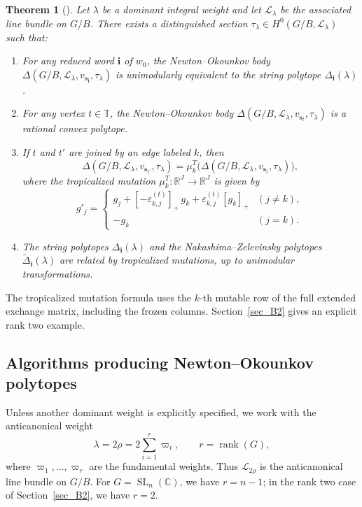 \documentclass[10pt]{amsart}
\numberwithin{equation}{section}
\DeclareMathOperator{\SL}{SL}
\newcommand{\C}{{\mathbb{C}}}
\newcommand{\R}{{\mathbb{R}}}
\theoremstyle{plain}
\newtheorem{theorem}{Theorem}[section]
\theoremstyle{definition}
\theoremstyle{remark}
\begin{document}
\begin{theorem}[{\cite[Corollaries~5.7(2), 6.6(1), 6.30 and Theorem~6.8(1)]{FujitaOya}}]\label{thm_Fujita_Oya}
	Let $\lambda$ be a dominant integral weight and let $\mathcal L_\lambda$ be the associated line bundle on $G/B$.
	There exists a distinguished section $\tau_\lambda\in H^0(G/B,\mathcal L_\lambda)$ such that:
	\begin{enumerate}
		\item For any reduced word ${\bm i}$ of $w_0$, the Newton--Okounkov body
		$\Delta(G/B,\mathcal L_\lambda,v_{{\bm s}_{\bm i}},\tau_\lambda)$ is unimodularly equivalent to the string polytope $\Delta_{\bm i}(\lambda)$.
		\item For any vertex $t\in\mathbb T$, the Newton--Okounkov body $\Delta(G/B,\mathcal L_\lambda,v_{{\bm s}_{t}},\tau_\lambda)$ is a rational convex polytope.
		\item If $t$ and $t'$ are joined by an edge labeled $k$, then
		\[
		\Delta(G/B,\mathcal L_\lambda,v_{{\bm s}_{t'}},\tau_\lambda)
		=\mu_k^{T}\bigl(\Delta(G/B,\mathcal L_\lambda,v_{{\bm s}_{t}},\tau_\lambda)\bigr),
		\]
		where the tropicalized mutation $\mu_k^T\colon \R^{J}\to \R^{J}$ is given by
		\[
		g'_j=
		\begin{cases}
			g_j+[-\varepsilon^{(t)}_{k,j}]_+\,g_k+\varepsilon^{(t)}_{k,j}[g_k]_+ & (j\neq k),\\
			-g_k & (j=k).
		\end{cases}
		\]
		\item The string polytopes $\Delta_{\bm i}(\lambda)$ and the Nakashima--Zelevinsky polytopes $\widetilde{\Delta}_{\bm i}(\lambda)$ are related by tropicalized mutations, up to unimodular transformations.
	\end{enumerate}
\end{theorem}

The tropicalized mutation formula uses the $k$-th
mutable row of the full extended exchange matrix,
including the frozen columns.
Section~\ref{sec_B2} gives an explicit rank two example.



\subsection{Algorithms producing Newton--Okounkov polytopes}
Unless another dominant weight is explicitly specified,
we work with the anticanonical weight
\[
\lambda=2\rho=2\sum_{i=1}^{r}\varpi_i,
\qquad r=\operatorname{rank}(G),
\]
where $\varpi_1,\ldots,\varpi_r$ are the fundamental
weights. Thus $\mathcal L_{2\rho}$ is the anticanonical
line bundle on $G/B$.
For $G=\SL_n(\C)$, we have $r=n-1$; in the rank two
case of Section~\ref{sec_B2}, we have $r=2$.
\end{document}
